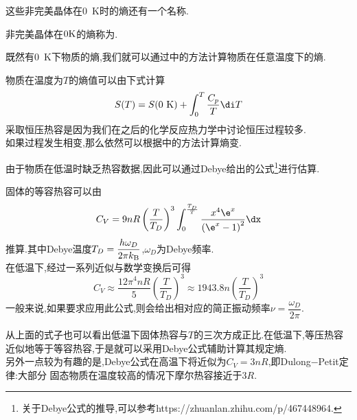 \documentclass{ctexart}
\begin{document}
这些非完美晶体在0\ K时的熵还有一个名称.
\begin{definition}[3D.3.2 残余熵]
    非完美晶体在$0\text K$的熵称为.
\end{definition}
既然有0\ K下物质的熵,我们就可以通过中的方法计算物质在任意温度下的熵.
\begin{theorem}[3D.3.3 规定熵]
    物质在温度为$T$的熵值可以由下式计算
    \[S(T)=S(0\text{ K})+\int_0^{T}\dfrac{C_p}{T}\di T\]
    采取恒压热容是因为我们在之后的化学反应热力学中讨论恒压过程较多.\\
    如果过程发生相变,那么依然可以根据中的方法计算熵变.
\end{theorem}
由于物质在低温时缺乏热容数据,因此可以通过Debye给出的公式\footnote{关于Debye公式的推导,可以参考https://zhuanlan.zhihu.com/p/467448964.}进行估算.
\begin{theorem}[3D.3.4 Debye公式]
    固体的等容热容可以由
    \[C_V=9nR\left(\dfrac{T}{T_D}\right)^3\int_0^{\frac{T_D}{T}}\dfrac{x^4\e^x}{\left(\e^x-1\right)^2}\dx\]
    推算.其中Debye温度$T_D=\dfrac{h\omega_D}{2\pi k_\text B}$,$\omega_D$为Debye频率.\\
    在低温下,经过一系列近似与数学变换后可得
    \[C_V\approx\dfrac{12\pi^4nR}{5}\left(\dfrac{T}{T_D}\right)^3\approx1943.8n\left(\dfrac{T}{T_D}\right)^3\]
    一般来说,如果要求应用此公式,则会给出相对应的简正振动频率$\nu=\dfrac{\omega_D}{2\pi}$.
\end{theorem}
从上面的式子也可以看出低温下固体热容与$T$的三次方成正比.在低温下,等压热容近似地等于等容热容,于是就可以采用Debye公式辅助计算其规定熵.\\
\indent 另外一点较为有趣的是,Debye公式在高温下将近似为$C_V=3nR$,即Dulong$-$Petit定律:大部分%
固态物质在温度较高的情况下摩尔热容接近于$3R$.
\end{document}
